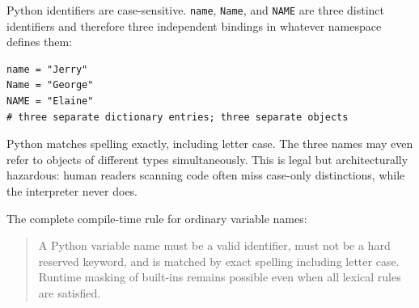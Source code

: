 Python identifiers are case-sensitive. \texttt{name}, \texttt{Name}, and \texttt{NAME} are three distinct identifiers and therefore three independent bindings in whatever namespace defines them:

\begin{verbatim}
name = "Jerry"
Name = "George"
NAME = "Elaine"
# three separate dictionary entries; three separate objects
\end{verbatim}

Python matches spelling exactly, including letter case. The three names may even refer to objects of different types simultaneously. This is legal but architecturally hazardous: human readers scanning code often miss case-only distinctions, while the interpreter never does.

The complete compile-time rule for ordinary variable names:

\begin{quote}
A Python variable name must be a valid identifier, must not be a hard reserved keyword, and is matched by exact spelling including letter case. Runtime masking of built-ins remains possible even when all lexical rules are satisfied.
\end{quote}
